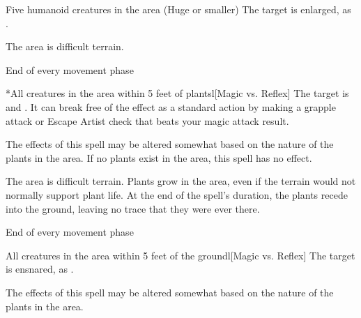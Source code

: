 \spelldur{\durshort \dismissable}
\begin{spelltarget}{Five humanoid creatures in the area (Huge or smaller)}
    \spelleffect The target is enlarged, as .
\end{spelltarget}

\spelldur{\durshort \dismissable}
\spellline
\spelleffect The area is difficult terrain.
\begin{spelltrigger}{End of every movement phase}
    \begin{spelltarget}*{All creatures in the area within 5 feet of plants}l[Magic vs. Reflex]
        \spellsuccess The target is \entangled and \immobilized. It can break free of the effect as a standard action by making a grapple attack or Escape Artist check that beats your magic attack result.
    \end{spelltarget}
\end{spelltrigger}
\spellnotes The effects of this spell may be altered somewhat based on the nature of the plants in the area. If no plants exist in the area, this spell has no effect.

\spelldur{\durshort \dismissable}
\spellline
\spelleffect The area is difficult terrain. Plants grow in the area, even if the terrain would not normally support plant life. At the end of the spell's duration, the plants recede into the ground, leaving no trace that they were ever there.
\begin{spelltrigger}{End of every movement phase}
    \begin{spelltarget}{All creatures in the area within 5 feet of the ground}l[Magic vs. Reflex]
        \spellsuccess The target is ensnared, as .
    \end{spelltarget}
\end{spelltrigger}
\spellnotes The effects of this spell may be altered somewhat based on the nature of the plants in the area.

